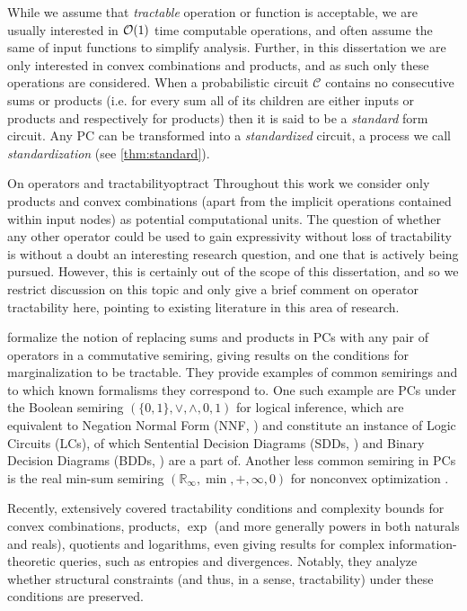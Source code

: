 While we assume that \emph{tractable} operation or function is acceptable, we are usually
interested in $\mathcal{O}(1)$ time computable operations, and often assume the same of input functions
to simplify analysis. Further, in this dissertation we are only interested in convex combinations
and products, and as such only these operations are considered. When a probabilistic circuit
$\mathcal{C}$ contains no consecutive sums or products (i.e. for every sum all of its children are
either inputs or products and respectively for products) then it is said to be a \emph{standard}
form circuit. Any PC can be transformed into a \emph{standardized} circuit, a process we call
\emph{standardization} (see \cref{thm:standard}).

\begin{remark}[breakable]{On operators and tractability}{optract}
  Throughout this work we consider only products and convex combinations (apart from the implicit
  operations contained within input nodes) as potential computational units. The question of whether
  any other operator could be used to gain expressivity without loss of tractability is without a
  doubt an interesting research question, and one that is actively being pursued. However, this is
  certainly out of the scope of this dissertation, and so we restrict discussion on this topic and
  only give a brief comment on operator tractability here, pointing to existing literature in this
  area of research.

  \citet{friesen16} formalize the notion of replacing sums and products in PCs with any pair of
  operators in a commutative semiring, giving results on the conditions for marginalization to be
  tractable. They provide examples of common semirings and to which known formalisms they
  correspond to. One such example are PCs under the Boolean semiring $(\{0,1\},\vee,\wedge,0,1)$
  for logical inference, which are equivalent to Negation Normal Form (NNF, \cite{barwise82}) and
  constitute an instance of Logic Circuits (LCs), of which Sentential Decision Diagrams (SDDs,
  \cite{darwiche11}) and Binary Decision Diagrams (BDDs, \cite{akers78}) are a part of. Another
  less common semiring in PCs is the real min-sum semiring $(\mathbb{R}_{\infty}, \min,+,\infty,0)$
  for nonconvex optimization \citep{friesen15}.

  Recently, \citet{vergari21} extensively covered tractability conditions and complexity bounds for
  convex combinations, products, $\exp$ (and more generally powers in both naturals and reals),
  quotients and logarithms, even giving results for complex information-theoretic queries, such as
  entropies and divergences. Notably, they analyze whether structural constraints (and thus, in a
  sense, tractability) under these conditions are preserved.


\end{remark}
